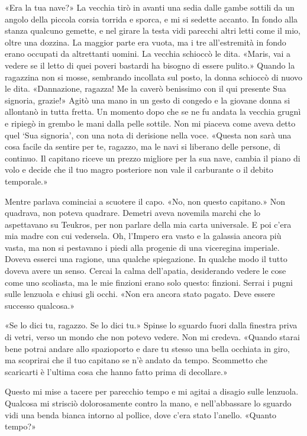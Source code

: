 «Era la tua nave?» La vecchia tirò in avanti una sedia dalle gambe
sottili da un angolo della piccola corsia torrida e sporca, e mi si
sedette accanto. In fondo alla stanza qualcuno gemette, e nel girare la
testa vidi parecchi altri letti come il mio, oltre una dozzina. La
maggior parte era vuota, ma i tre all'estremità in fondo erano occupati
da altrettanti uomini. La vecchia schioccò le dita. «Maris, vai a vedere
se il letto di quei poveri bastardi ha bisogno di essere pulito.» Quando
la ragazzina non si mosse, sembrando incollata sul posto, la donna
schioccò di nuovo le dita. «Dannazione, ragazza! Me la caverò benissimo
con il qui presente Sua signoria, grazie!» Agitò una mano in un gesto di
congedo e la giovane donna si allontanò in tutta fretta. Un momento dopo
che se ne fu andata la vecchia grugnì e ripiegò in grembo le mani dalla
pelle sottile. Non mi piaceva come aveva detto quel `Sua signoria', con
una nota di derisione nella voce. «Questa non sarà una cosa facile da
sentire per te, ragazzo, ma le navi si liberano delle persone, di
continuo. Il capitano riceve un prezzo migliore per la sua nave, cambia
il piano di volo e decide che il tuo magro posteriore non vale il
carburante o il debito temporale.»

Mentre parlava cominciai a scuotere il capo. «No, non questo capitano.»
Non quadrava, non poteva quadrare. Demetri aveva novemila marchi che lo
aspettavano su Teukros, per non parlare della mia carta universale. E
poi c'era mia madre con cui vedersela. Oh, l'Impero era vasto e la
galassia ancora più vasta, ma non si pestavano i piedi alla progenie di
una viceregina imperiale. Doveva esserci una ragione, una qualche
spiegazione. In qualche modo il tutto doveva avere un senso. Cercai la
calma dell'apatia, desiderando vedere le cose come uno scoliasta, ma le
mie finzioni erano solo questo: finzioni. Serrai i pugni sulle lenzuola
e chiusi gli occhi. «Non era ancora stato pagato. Deve essere successo
qualcosa.»

«Se lo dici tu, ragazzo. Se lo dici tu.» Spinse lo sguardo fuori dalla
finestra priva di vetri, verso un mondo che non potevo vedere. Non mi
credeva. «Quando starai bene potrai andare allo spazioporto e dare tu
stesso una bella occhiata in giro, ma scoprirai che il tuo capitano se
n'è andato da tempo. Scommetto che scaricarti è l'ultima cosa che hanno
fatto prima di decollare.»

Questo mi mise a tacere per parecchio tempo e mi agitai a disagio sulle
lenzuola. Qualcosa mi strisciò dolorosamente contro la mano, e
nell'abbassare lo sguardo vidi una benda bianca intorno al pollice, dove
c'era stato l'anello. «Quanto tempo?»

